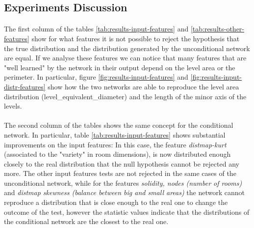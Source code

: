 \subsection{Experiments Discussion}
\paragraph{} The first column of the tables \ref{tab:results-input-features} and \ref{tab:results-other-features} show for what features it is not possible to reject the hypothesis that the true distribution and the distribution generated by the unconditional network are equal. If we analyse these features we can notice that many features that are "well learned" by the network in their output depend on the level area or the perimeter. In particular, figure \ref{fig:results-input-features} and \ref{fig:results-input-distr-features} show how the two networks are able to reproduce the level area distribution (level\_equivalent\_diameter) and the length of the minor axis of the levels. 

\paragraph{} The second column of the tables shows the same concept for the conditional network. In particular, table \ref{tab:results-input-features} shows substantial improvements on the input features: In this case, the feature  \textit{distmap-kurt} (associated to the "variety" in room dimensions), is now distributed enough closely to the real distribution that the null hypothesis cannot be rejected any more. The other input features tests are not rejected in the same cases of the unconditional network, while for the features \textit{solidity, nodes (number of rooms)} and \textit{distmap skewness (balance between big and small areas)} the network cannot reproduce a distribution that is close enough to the real one to change the outcome of the test, however the statistic values indicate that the distributions of the conditional network are the closest to the real one.

